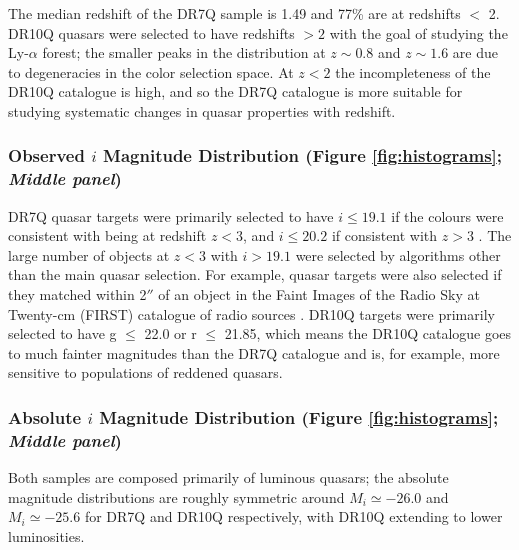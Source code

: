 The median redshift of the DR7Q sample is 1.49 and 77\% are at redshifts $<$ 2. 
DR10Q quasars were selected to have redshifts $>2$ with the goal of studying the Ly-$\alpha$ forest; the smaller peaks in the distribution at $z \sim 0.8$ and $z \sim 1.6$ are due to degeneracies in the color selection space. At $z<2$ the incompleteness of the DR10Q catalogue is high, and so the DR7Q catalogue is more suitable for studying systematic changes in quasar properties with redshift. 

\subsubsection{Observed $i$ Magnitude Distribution (Figure \ref{fig:histograms}; {\it Middle panel})}

DR7Q quasar targets were primarily selected to have $i \leq 19.1$ if the colours were consistent with being at redshift $z < 3$, and $i \leq 20.2$ if consistent with $z > 3$ \citep{richards02}. 
The large number of objects at $z < 3$ with $i > 19.1$ were selected by algorithms other than the main quasar selection. 
For example, quasar targets were also selected if they matched within 2$''$ of an object in the Faint Images of the Radio Sky at Twenty-cm (FIRST) catalogue of radio sources \citep{becker95}. 
DR10Q targets were primarily selected to have g $\leq$ 22.0 or r $\leq$ 21.85, which means the DR10Q catalogue goes to much fainter magnitudes than the DR7Q catalogue and is, for example, more sensitive to populations of reddened quasars. 

\subsubsection{Absolute $i$ Magnitude Distribution (Figure \ref{fig:histograms}; {\it Middle panel})}

Both samples are composed primarily of luminous quasars; the absolute magnitude distributions are roughly symmetric around $M_i \simeq -26.0$ and $M_i \simeq -25.6$ for DR7Q and DR10Q respectively, with DR10Q extending to lower luminosities.  

